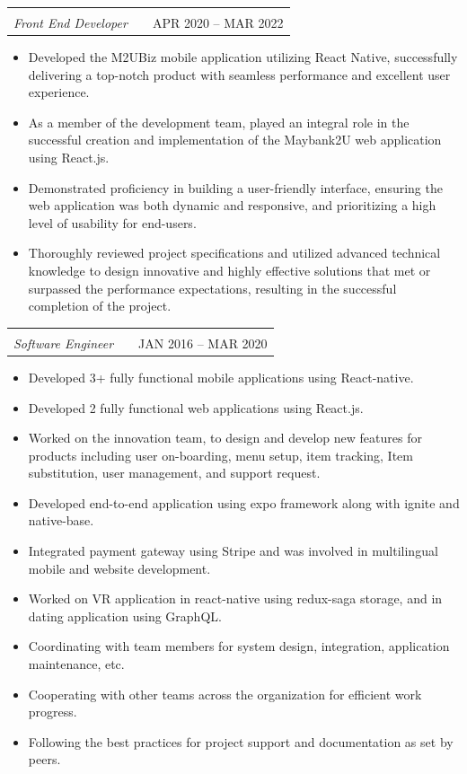 \documentclass[a4paper,12pt]{article}
\makeatletter
\newenvironment{joblong}[2]
    {
    \begin{tabularx}{\linewidth}{@{}l X r@{}}
    \textbf{#1} & \hfill & #2 \\[3.75pt]
    \end{tabularx}
    \begin{minipage}[t]{\linewidth}
    \begin{itemize}[nosep,after=\strut,leftmargin=1em,itemsep=3pt,label=--]
    }
    {
    \end{itemize}
    \end{minipage}
    }
\newcommand{\jobheading}[2]{%
    \begin{tabular}[t]{@{}l@{}}
    #1\\[-1pt]
    \normalfont\textit{#2}
    \end{tabular}%
}
\makeatother
\begin{document}
\begin{joblong}
{\jobheading{Maybank, Malaysia}{Front End Developer}}
{APR 2020 -- MAR 2022}
\item Developed the M2UBiz mobile application utilizing React Native, successfully delivering a top-notch product with seamless performance and excellent user experience.
\item As a member of the development team, played an integral role in the successful creation and implementation of the Maybank2U web application using React.js.
\item Demonstrated proficiency in building a user-friendly interface, ensuring the web application was both dynamic and responsive, and prioritizing a high level of usability for end-users.
\item Thoroughly reviewed project specifications and utilized advanced technical knowledge to design innovative and highly effective solutions that met or surpassed the performance expectations, resulting in the successful completion of the project.
\end{joblong}

\begin{joblong}
{\jobheading{Simform Solutions, Gujarat, IN}{Software Engineer}}
{JAN 2016 -- MAR 2020}
\item Developed 3+ fully functional mobile applications using React-native.
\item Developed 2 fully functional web applications using React.js.
\item Worked on the innovation team, to design and develop new features for products including user on-boarding, menu setup, item tracking, Item substitution, user management, and support request.
\item Developed end-to-end application using expo framework along with ignite and native-base.
\item Integrated payment gateway using Stripe and was involved in multilingual mobile and website development.
\item Worked on VR application in react-native using redux-saga storage, and in dating application using GraphQL.
\item Coordinating with team members for system design, integration, application maintenance, etc.
\item Cooperating with other teams across the organization for efficient work progress.
\item Following the best practices for project support and documentation as set by peers.
\end{joblong}
\end{document}
